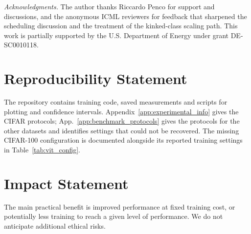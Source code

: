 \noindent\emph{Acknowledgments.} The author thanks Riccardo Penco for support and discussions, and the anonymous ICML reviewers for feedback that sharpened the scheduling discussion and the treatment of the kinked-class scaling path. This work is partially supported by the U.S. Department of Energy under grant DE-SC0010118.

\section*{Reproducibility Statement}
\label{sec:reproducibility}
The repository contains training code, saved measurements and scripts for plotting and confidence intervals. Appendix~\ref{app:experimental_info} gives the CIFAR protocols; App.~\ref{app:benchmark_protocols} gives the protocols for the other datasets and identifies settings that could not be recovered. The missing CIFAR-100 configuration is documented alongside its reported training settings in Table~\ref{tab:vit_config}.

\section*{Impact Statement}
The main practical benefit is improved performance at fixed training cost, or potentially less training to reach a given level of performance. We do not anticipate additional ethical risks.
